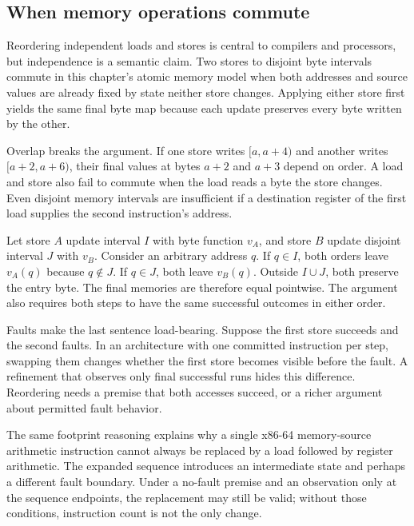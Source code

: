 \subsection{When memory operations commute}

Reordering independent loads and stores is central to compilers and processors,
but independence is a semantic claim. Two stores to disjoint byte intervals
commute in this chapter's atomic memory model when both addresses and source
values are already fixed by state neither store changes. Applying either store
first yields the same final byte map because each update preserves every byte
written by the other.

Overlap breaks the argument. If one store writes \([a,a+4)\) and another
writes \([a+2,a+6)\), their final values at bytes \(a+2\) and \(a+3\)
depend on order. A load and store also fail to commute when the load reads a
byte the store changes. Even disjoint memory intervals are insufficient if a
destination register of the first load supplies the second instruction's
address.

\begin{proofkit}[title={Disjoint stores commute}]
Let store \(A\) update interval \(I\) with byte function \(v_A\), and store
\(B\) update disjoint interval \(J\) with \(v_B\). Consider an arbitrary
address \(q\). If \(q\in I\), both orders leave \(v_A(q)\) because
\(q\notin J\). If \(q\in J\), both leave \(v_B(q)\). Outside
\(I\cup J\), both preserve the entry byte. The final memories are therefore
equal pointwise. The argument also requires both steps to have the same
successful outcomes in either order.
\end{proofkit}

Faults make the last sentence load-bearing. Suppose the first store succeeds
and the second faults. In an architecture with one committed instruction per
step, swapping them changes whether the first store becomes visible before the
fault. A refinement that observes only final successful runs hides this
difference. Reordering needs a premise that both accesses succeed, or a richer
argument about permitted fault behavior.

The same footprint reasoning explains why a single x86-64 memory-source
arithmetic instruction cannot always be replaced by a load followed by
register arithmetic. The expanded sequence introduces an intermediate state
and perhaps a different fault boundary. Under a no-fault premise and an
observation only at the sequence endpoints, the replacement may still be
valid; without those conditions, instruction count is not the only change.

